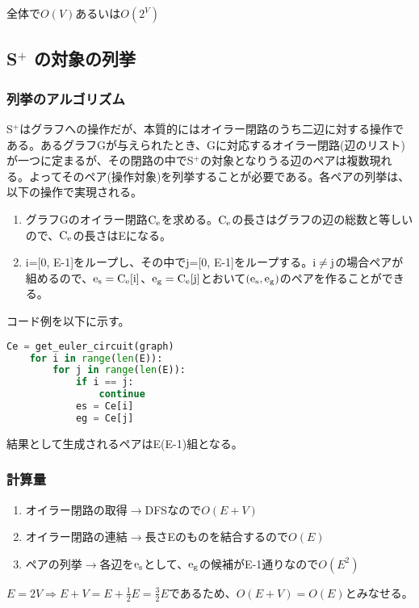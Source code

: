 \documentclass[11pt,a4j]{jarticle}
\newcommand{\splus}{S${}^\text{+}$}
\newcommand{\f}[1]{$\rm{#1}$} %
\newcommand{\ra }{$\rightarrow$}
\newcommand{\tops}[2]{\texorpdfstring{#1}{#2}} %
\begin{document}
全体で$O(V)$あるいは$O(2^V)$

\subsection{\tops{\splus}{S+} の対象の列挙}
\label{enum}
\subsubsection{列挙のアルゴリズム}
\splus はグラフへの操作だが、本質的にはオイラー閉路のうち二辺に対する操作である。あるグラフGが与えられたとき、Gに対応するオイラー閉路(辺のリスト)が一つに定まるが、その閉路の中で\splus の対象となりうる辺のペアは複数現れる。よってそのペア(操作対象)を列挙することが必要である。各ペアの列挙は、以下の操作で実現される。

\begin{enumerate}
    \item グラフGのオイラー閉路\f{C_e}を求める。\f{C_e}の長さはグラフの辺の総数と等しいので、\f{C_e}の長さはEになる。
    \item i=[0, E-1]をループし、その中でj=[0, E-1]をループする。\f{i\neq j}の場合ペアが組めるので、\f{e_s=C_e[i]}、\f{e_g=C_e[j]}とおいて\f{(e_s, e_g)}のペアを作ることができる。
\end{enumerate}

コード例を以下に示す。

\begin{center}
    \begin{lstlisting}[language=Python]
    Ce = get_euler_circuit(graph)
    for i in range(len(E)):
        for j in range(len(E)):
            if i == j:
                continue
            es = Ce[i]
            eg = Ce[j]
    \end{lstlisting}
\end{center}
結果として生成されるペアはE(E-1)組となる。

\subsubsection{計算量}
\begin{enumerate}
    \item オイラー閉路の取得\ra DFSなので$O(E+V)$
    \item オイラー閉路の連結\ra 長さEのものを結合するので$O(E)$
    \item ペアの列挙\ra 各辺を\f{e_s}として、\f{e_g}の候補がE-1通りなので$O(E^2)$
\end{enumerate}
$E=2V \Rightarrow E+V=E+\frac{1}{2}E=\frac{3}{2}E$であるため、$O(E+V)=O(E)$とみなせる。
\end{document}
